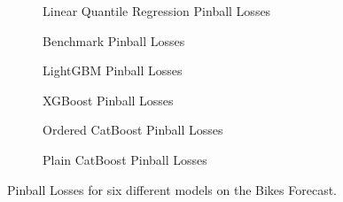 \begin{figure}[htbp]
    \centering
    \begin{subfigure}[b]{0.5\textwidth}
        \centering
        
        \caption{Linear Quantile Regression Pinball Losses}
        \label{fig:small-orfe-pinball-bikes}
    \end{subfigure}%
    \begin{subfigure}[b]{0.5\textwidth}
        \centering
        
        \caption{Benchmark Pinball Losses}
        \label{fig:armed-play-pinball-bikes}
    \end{subfigure}
    
    \begin{subfigure}[b]{0.5\textwidth}
        \centering
        
        \caption{LightGBM Pinball Losses}
        \label{fig:mangy-flux-pinball-bikes}
    \end{subfigure}%
    \begin{subfigure}[b]{0.5\textwidth}
        \centering
        
        \caption{XGBoost Pinball Losses}
        \label{fig:couth-ruby-pinball-bikes}
    \end{subfigure}
    
    \begin{subfigure}[b]{0.5\textwidth}
        \centering
        
        \caption{Ordered CatBoost Pinball Losses}
        \label{fig:civil-leas-pinball-bikes}
    \end{subfigure}%
    \begin{subfigure}[b]{0.5\textwidth}
        \centering
        
        \caption{Plain CatBoost Pinball Losses}
        \label{fig:blear-dita-pinball-bikes}
    \end{subfigure}
    
    \caption{Pinball Losses for six different models on the Bikes Forecast.}
    \label{fig:bikes_pinball}
\end{figure}